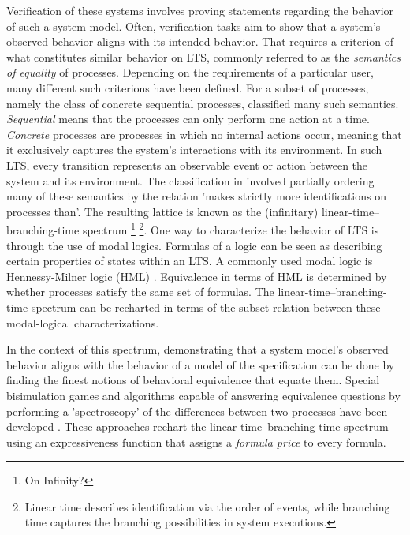 \begin{isabellebody}
\begin{isamarkuptext}
Verification of these systems involves proving statements regarding the behavior of such a system model. Often, verification tasks aim to show that a system's observed behavior aligns with its intended behavior.
That requires a criterion of what constitutes similar behavior on LTS, commonly referred to as the \textit{semantics of equality} of processes. Depending on the requirements of a particular user, many different such criterions have been defined.
For a subset of processes, namely the class of concrete sequential processes, \cite{GLABBEEK20013} classified many such semantics. 
\textit{Sequential} means that the processes can only perform one action at a time. \textit{Concrete} processes are processes in which no internal actions occur, meaning that it exclusively captures the system's interactions with its environment.
In such LTS, every transition represents an observable event or action between the system and its environment.
The classification in \cite{GLABBEEK20013} involved partially ordering many of these semantics by the relation 'makes strictly more identifications on processes than'. The resulting lattice is
known as the (infinitary) linear-time--branching-time spectrum \footnote{On Infinity?} 
\footnote{Linear time describes identification via the order of events, while branching time captures the branching possibilities in system executions.}.
One way to characterize the behavior of LTS is through the use of modal logics. Formulas of a logic can be seen as describing certain properties of states within an LTS. A commonly used modal logic is Hennessy-Milner logic (HML) \cite{hm85}. 
Equivalence in terms of HML is determined by whether processes satisfy the same set of formulas. The linear-time--branching-time spectrum can be recharted in terms of the subset relation between these modal-logical characterizations.%
\end{isamarkuptext}\isamarkuptrue%
%
\begin{isamarkuptext}%
In the context of this spectrum, demonstrating that a system model's observed behavior aligns with the behavior of a model of the specification can be done by 
finding the finest notions of behavioral equivalence that equate them. Special bisimulation games and algorithms capable of answering equivalence questions 
by performing a 'spectroscopy' of the differences between two processes have been developed \cite{bisping2022deciding}\cite{bisping2023process}.
These approaches rechart the linear-time--branching-time spectrum using an expressiveness function that assigns a \textit{formula price} to every formula. 

\end{isamarkuptext}
\end{isabellebody}
